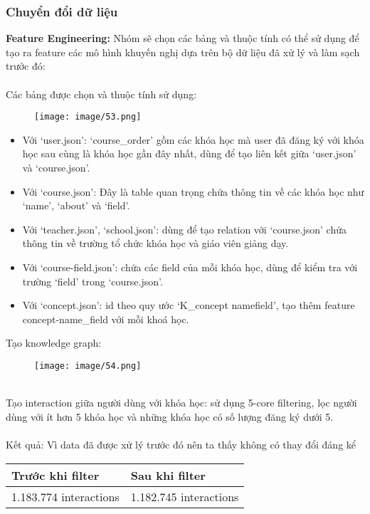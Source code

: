 \subsubsection{Chuyển đổi dữ liệu}
\textbf{Feature Engineering:}
Nhóm sẽ chọn các bảng và thuộc tính có thể sử dụng để tạo ra feature các mô hình khuyến nghị dựa trên bộ dữ liệu đã xử lý và làm sạch trước đó:\\
\\
Các bảng được chọn và thuộc tính sử dụng:
\begin{figure}[h]
    \centering
    \texttt{[image: image/53.png]}
\end{figure}
\newpage
\begin{itemize}
    \item Với ‘user.json’: ‘course\_order’ gồm các khóa học mà user đã đăng ký với khóa học sau cùng là khóa học gần đây nhất, dùng để tạo liên kết giữa ‘user.json’ và ‘course.json’.
    \item Với ‘course.json’: Đây là table quan trọng chứa thông tin về các khóa học như ‘name’, ‘about’ và ‘field’.
    \item Với ‘teacher.json’, ‘school.json’: dùng để tạo relation với ‘course.json’ chứa thông tin về trường tổ chức khóa học và giáo viên giảng dạy.
    \item Với ‘course-field.json’: chứa các field của mỗi khóa học, dùng để kiểm tra với trường ‘field’ trong ‘course.json’.
    \item Với ‘concept.json’: id theo quy ước ‘K\_{concept name}{field}’, tạo thêm feature concept-name\_field với mỗi khoá học.
\end{itemize}
Tạo knowledge graph:
\begin{figure}[h]
    \centering
    \texttt{[image: image/54.png]}
\end{figure}\\
Tạo interaction giữa người dùng với khóa học: sử dụng 5-core filtering, lọc người dùng với ít hơn 5 khóa học và những khóa học có số lượng đăng ký dưới 5.\\
\\
Kết quả: Vì data đã được xử lý trước đó nên ta thấy không có thay đổi đáng kể
\begin{center}
\begin{tabular}{|| m{15em}  m{15em}||} 
 \hline
 Trước khi filter & Sau khi filter\\ [0.5ex] 
 \hline\hline
 1.183.774 interactions & 1.182.745 interactions \\ [1ex]
 \hline
\end{tabular}
\end{center}
